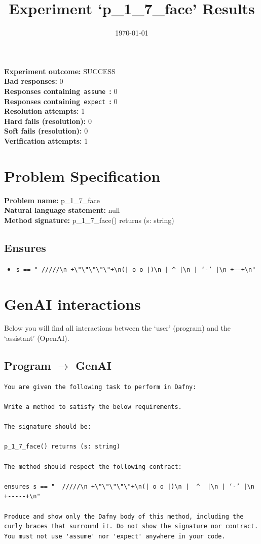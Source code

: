 \documentclass{article}
\begin{document}
\title{Experiment `p\_1\_7\_face' Results}
\author{\today}
\date{}
\maketitle
\textbf{Experiment outcome: }SUCCESS
\\\textbf{Bad responses: }0
\\\textbf{Responses containing}~\texttt{assume}~\textbf{: }0
\\\textbf{Responses containing}~\texttt{expect}~\textbf{: }0
\\\textbf{Resolution attempts: }1
\\\textbf{Hard fails (resolution): }0
\\\textbf{Soft fails (resolution): }0
\\\textbf{Verification attempts: }1
\section*{Problem Specification}
\textbf{Problem name: }p\_1\_7\_face
\\\textbf{Natural language statement: }null
\\\textbf{Method signature: }p\_1\_7\_face() returns (s: string)
\subsection*{Ensures}
\begin{itemize}
\item \texttt{s == "  /////\textbackslash{}n +\textbackslash{}"\textbackslash{}"\textbackslash{}"\textbackslash{}"\textbackslash{}"+\textbackslash{}n(| o o |)\textbackslash{}n |  \^{}  |\textbackslash{}n | ‘-’ |\textbackslash{}n +-----+\textbackslash{}n"}
\end{itemize}
\clearpage
\section*{GenAI interactions}
Below you will find all interactions between the `user' (program) and the `assistant' (OpenAI).
\subsection*{Program $\rightarrow$ GenAI}
\begin{lstlisting}
You are given the following task to perform in Dafny:

Write a method to satisfy the below requirements.

The signature should be:

p_1_7_face() returns (s: string)

The method should respect the following contract:

ensures s == "  /////\n +\"\"\"\"\"+\n(| o o |)\n |  ^  |\n | ‘-’ |\n +-----+\n"

Produce and show only the Dafny body of this method, including the curly braces that surround it. Do not show the signature nor contract. You must not use 'assume' nor 'expect' anywhere in your code.
\end{lstlisting}
\end{document}
